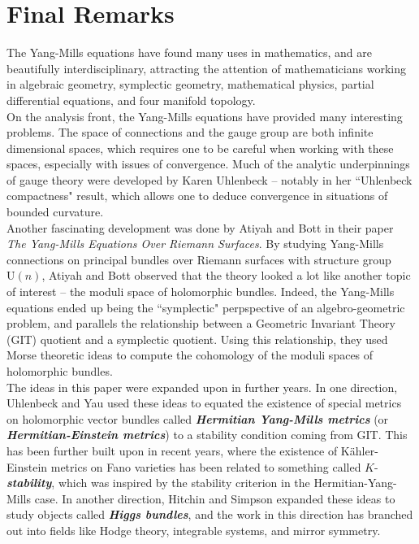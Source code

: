 \documentclass[psamsfonts, 12pt]{amsart}
\theoremstyle{definition}
\theoremstyle{remark}
\newcommand{\ib}[1]{\textbf{\textit{#1}}}
\begin{document}
\section{Final Remarks}
%
The Yang-Mills equations have found many uses in mathematics, and are beautifully
interdisciplinary, attracting the attention of mathematicians working in algebraic
geometry, symplectic geometry, mathematical physics, partial differential equations,
and four manifold topology. \\

On the analysis front, the Yang-Mills equations have provided many interesting
problems. The space of connections and the gauge group are both infinite dimensional
spaces, which requires one to be careful when working with these spaces, especially
with issues of convergence. Much of the analytic underpinnings of gauge theory were
developed by Karen Uhlenbeck --  notably in her ``Uhlenbeck compactness" result, which
allows one to deduce convergence in situations of bounded curvature. \\

Another fascinating development was done by Atiyah and Bott in their paper
\emph{The Yang-Mills Equations Over Riemann Surfaces}. By studying Yang-Mills
connections on principal bundles over Riemann surfaces with structure group
$\mathrm{U}(n)$, Atiyah and Bott observed that the theory looked a lot like
another topic of interest -- the moduli space of holomorphic bundles. Indeed,
the Yang-Mills equations ended up being the ``symplectic" perpspective of
an algebro-geometric problem, and parallels the relationship between a Geometric
Invariant Theory (GIT) quotient and a symplectic quotient. Using this relationship,
they used Morse theoretic ideas to compute the cohomology of the moduli spaces
of holomorphic bundles. \\

The ideas in this paper were expanded upon in further years. In one direction,
Uhlenbeck and Yau used these ideas to equated the existence of special metrics
on holomorphic vector bundles called \ib{Hermitian Yang-Mills metrics} (or
\ib{Hermitian-Einstein metrics}) to a stability condition coming from GIT. This
has been further built upon in recent years, where the existence of K\"ahler-Einstein
metrics on Fano varieties has been related to something called $K$-\ib{stability},
which was inspired by the stability criterion in the Hermitian-Yang-Mills case. In
another direction, Hitchin and Simpson expanded these ideas to study objects called
\ib{Higgs bundles}, and the work in this direction has branched out into fields like
Hodge theory, integrable systems, and mirror symmetry. \\
\end{document}
